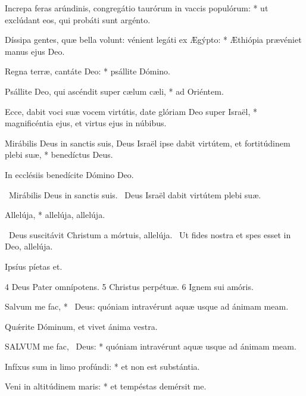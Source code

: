 Increpa feras arúndinis, congregátio taurórum in vaccis populórum: * ut exclúdant eos, qui probáti sunt argénto.

Díssipa gentes, quæ bella volunt: vénient legáti ex Ægýpto: * Æthiópia prævéniet manus ejus Deo.

Regna terræ, cantáte Deo: * psállite Dómino.

Psállite Deo, qui ascéndit super cælum cæli, * ad Oriéntem.

Ecce, dabit voci suæ vocem virtútis, date glóriam Deo super Israël, * magnificéntia ejus, et virtus ejus in núbibus.

Mirábilis Deus in sanctis suis, Deus Israël ipse dabit virtútem, et fortitúdinem plebi suæ, * benedíctus Deus.

 In ecclésiis benedícite Dómino Deo.



\V\ Mirábilis Deus in sanctis suis. \R\ Deus Israël dabit virtútem plebi suæ.



 Allelúja, * allelúja, allelúja.

\V\ Deus suscitávit Christum a mórtuis, allelúja. \R\ Ut fides nostra et spes esset in Deo, allelúja.

 Ipsíus píetas et.

 4 Deus Pater omnípotens. 5 Christus perpétuæ. 6 Ignem sui amóris.



 Salvum me fac, * \textdagger\ Deus: quóniam intravérunt aquæ usque ad ánimam meam. \textdaggerdbl


 Quǽrite Dóminum, et vivet ánima vestra.


\lettrine[lines=2]{S}{ALVUM} me fac, \textdagger\ Deus: * quóniam intravérunt aquæ usque ad ánimam meam. \textdaggerdbl

Infíxus sum in limo profúndi: * et non est substántia.

Veni in altitúdinem maris: * et tempéstas demérsit me.


